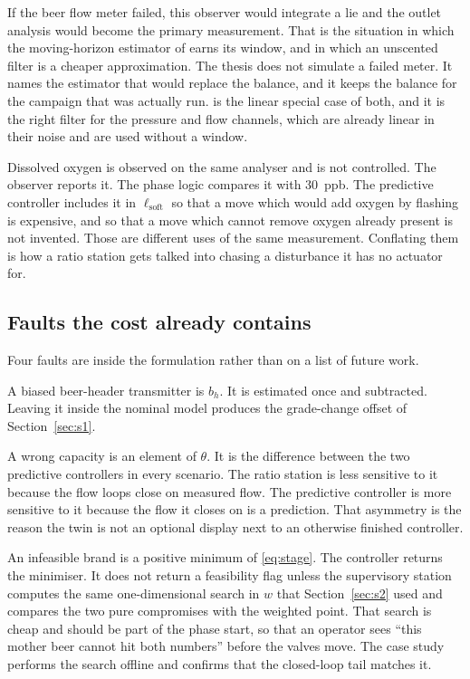 If the beer flow meter failed, this observer would integrate a lie and the outlet analysis would become the primary measurement. That is the situation in which the moving-horizon estimator of \citet{rao2003} earns its window, and in which an unscented filter \citep{julier2004} is a cheaper approximation. The thesis does not simulate a failed meter. It names the estimator that would replace the balance, and it keeps the balance for the campaign that was actually run. \citet{kalman1960} is the linear special case of both, and it is the right filter for the pressure and flow channels, which are already linear in their noise and are used without a window.

Dissolved oxygen is observed on the same analyser and is not controlled. The observer reports it. The phase logic compares it with \SI{30}{ppb}. The predictive controller includes it in $\ell_{\mathrm{soft}}$ so that a move which would add oxygen by flashing is expensive, and so that a move which cannot remove oxygen already present is not invented. Those are different uses of the same measurement. Conflating them is how a ratio station gets talked into chasing a disturbance it has no actuator for.

\subsection{Faults the cost already contains}
\label{sec:faults}

Four faults are inside the formulation rather than on a list of future work.

A biased beer-header transmitter is $b_h$. It is estimated once and subtracted. Leaving it inside the nominal model produces the grade-change offset of Section~\ref{sec:s1}.

A wrong capacity is an element of $\theta$. It is the difference between the two predictive controllers in every scenario. The ratio station is less sensitive to it because the flow loops close on measured flow. The predictive controller is more sensitive to it because the flow it closes on is a prediction. That asymmetry is the reason the twin is not an optional display next to an otherwise finished controller.

An infeasible brand is a positive minimum of \eqref{eq:stage}. The controller returns the minimiser. It does not return a feasibility flag unless the supervisory station computes the same one-dimensional search in $w$ that Section~\ref{sec:s2} used and compares the two pure compromises with the weighted point. That search is cheap and should be part of the phase start, so that an operator sees ``this mother beer cannot hit both numbers'' before the valves move. The case study performs the search offline and confirms that the closed-loop tail matches it.

